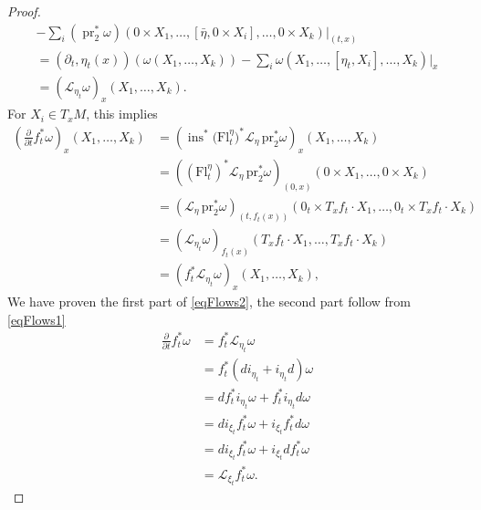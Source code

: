 \documentclass{article}
\theoremstyle{definition}
\begin{document}
\begin{proof}
\begin{equation*}
\begin{split}
            -\sum_i (\operatorname{pr}_2^* \omega) (0 \times X_1, \ldots, [\bar{\eta}, 0 \times X_i], \ldots, 0 \times X_k)|_{(t,x)}\\
            =\left(\partial_t, \eta_t(x)\right)\left(\omega\left(X_1, \ldots, X_k\right)\right) - \sum_i \omega\left(X_1, \ldots,\left[\eta_t, X_i\right], \ldots, X_k\right)|_x \\ 
            = \left(\mathcal{L}_{\eta_t} \omega\right)_x\left(X_1, \ldots, X_k\right).
        \end{split}
    \end{equation*}
    For $X_i \in T_xM$, this implies
    \begin{equation}
        \begin{split}
            \left( \frac{\partial}{\partial t} f_t^* \omega \right)_x (X_1, \ldots, X_k) 
            &= \left( \operatorname{ins}^*\bigl(\mathrm{Fl}^{\eta}_t\bigr)^* \mathcal{L}_\eta \, \mathrm{pr}_2^* \omega \right)_x (X_1, \ldots, X_k) \\
            &= \left( \left(\mathrm{Fl}^{\eta}_t\right)^* \mathcal{L}_\eta \, \mathrm{pr}_2^* \omega \right)_{(0,x)} (0 \times X_1, \ldots, 0 \times X_k) \\
            &= \left( \mathcal{L}_\eta \, \mathrm{pr}_2^* \omega \right)_{(t, f_t(x))} (0_t \times T_x f_t \cdot X_1, \ldots, 0_t \times T_x f_t \cdot X_k) \\
            &= \left( \mathcal{L}_{\eta_t} \omega \right)_{f_t(x)} (T_x f_t \cdot X_1, \ldots, T_x f_t \cdot X_k) \\
            &= \left( f_t^* \mathcal{L}_{\eta_t} \omega \right)_x (X_1, \ldots, X_k),
        \end{split}
    \end{equation}
    We have proven the first part of \eqref{eqFlows2}, the second part follow from \eqref{eqFlows1}
    \begin{equation}
        \begin{split}
        \frac{\partial}{\partial t} f_t^* \omega 
        &= f_t^* \mathcal{L}_{\eta_t} \omega \\
        &= f_t^* \left( d i_{\eta_t} + i_{\eta_t} d \right) \omega \\
        &= d f_t^* i_{\eta_t} \omega + f_t^* i_{\eta_t} d \omega \\
        &= d i_{\xi_t} f_t^* \omega + i_{\xi_t} f_t^* d \omega \\
        &= d i_{\xi_t} f_t^* \omega + i_{\xi_t} d f_t^* \omega \\
        &= \mathcal{L}_{\xi_t} f_t^* \omega.
        \end{split}
        \end{equation}
\end{proof}
\end{document}
